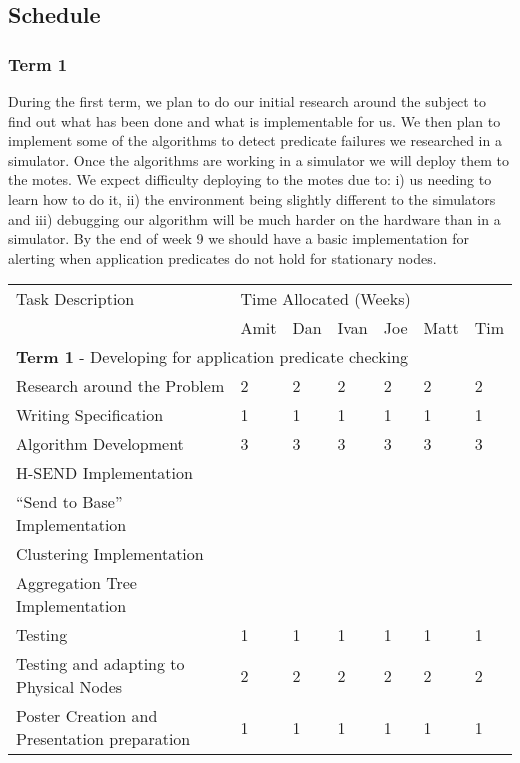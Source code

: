 \documentclass[a4paper]{article}
\begin{document}
\subsection{Schedule}

\subsubsection{Term 1}

During the first term, we plan to do our initial research around the subject to
find out what has been done and what is implementable for us. We then plan to
implement some of the algorithms to detect predicate failures we researched in a
simulator. Once the algorithms are working in a simulator we will deploy them to
the motes. We expect difficulty deploying to the motes due to: i) us needing to
learn how to do it, ii) the environment being slightly different to the
simulators and iii) debugging our algorithm will be much harder on the hardware
than in a simulator. By the end of week 9 we should have a basic implementation
for alerting when application predicates do not hold for stationary nodes.

\begin{table}[H]
	\centering
	\begin{tabular}{| l | l | l | l | l | l | l |}
	Task Description & \multicolumn{6}{|l|}{Time Allocated (Weeks)}\\
	~ & Amit & Dan & Ivan & Joe & Matt & Tim \\
	\hline
	\hline
	\multicolumn{7}{|l|}{\textbf{Term 1} - Developing for application
predicate checking} \\
	\hline


	Research around the Problem & 2 & 2 & 2 & 2 & 2 & 2\\
	Writing Specification & 1 & 1 & 1 & 1 & 1 & 1\\
	Algorithm Development & 3 & 3 & 3 & 3 & 3 & 3\\
	H-SEND Implementation & ~ & ~ & ~ & ~ & ~ & ~\\
	``Send to Base'' Implementation & ~ & ~ & ~ & ~ & ~ & ~\\
	Clustering Implementation & ~ & ~ & ~ & ~ & ~ & ~\\
	Aggregation Tree Implementation & ~ & ~ & ~ & ~ & ~ & ~\\
	Testing & 1 & 1 & 1 & 1 & 1 & 1\\
	Testing and adapting to Physical Nodes & 2 & 2 & 2 & 2 & 2 & 2\\
	Poster Creation and Presentation preparation & 1 & 1 & 1 & 1 & 1 & 1\\

	\hline
	
	\end{tabular}
\end{table}
\end{document}
